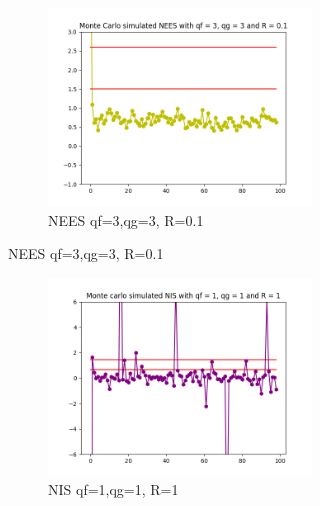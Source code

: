 \documentclass{article}
\begin{document}
\begin{figure}[H]
\begin{subfigure} {1\textwidth}
                \begin{subfigure}{.3\textwidth}
                    \includegraphics[width=1\linewidth]{./img/mc/nees3r01.png}
                    \caption{NEES qf=3,qg=3, R=0.1 }
                \end{subfigure}
            \end{subfigure} 
            \begin{subfigure} {1\textwidth}    
                \begin{subfigure}{.3\textwidth}  
                    \includegraphics[width=1\linewidth]{./img/mc/nis.png}
                    \caption{NIS qf=1,qg=1, R=1}
                \end{subfigure}
                \begin{subfigure}{.3\textwidth}  

\end{subfigure}
\end{subfigure}
\end{figure}
\end{document}
